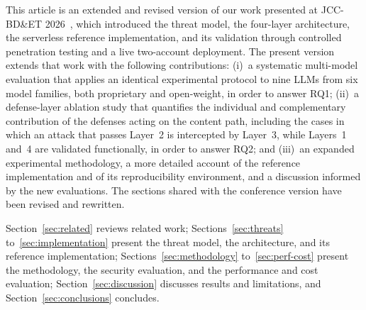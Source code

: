 This article is an extended and revised version of our work presented at JCC-BD\&ET 2026~\cite{petrocelli2026jcc}, which introduced the threat model, the four-layer architecture, the serverless reference implementation, and its validation through controlled penetration testing and a live two-account deployment. The present version extends that work with the following contributions: (i)~a systematic multi-model evaluation that applies an identical experimental protocol to nine LLMs from six model families, both proprietary and open-weight, in order to answer RQ1; (ii)~a defense-layer ablation study that quantifies the individual and complementary contribution of the defenses acting on the content path, including the cases in which an attack that passes Layer~2 is intercepted by Layer~3, while Layers~1 and~4 are validated functionally, in order to answer RQ2; and (iii)~an expanded experimental methodology, a more detailed account of the reference implementation and of its reproducibility environment, and a discussion informed by the new evaluations. The sections shared with the conference version have been revised and rewritten.

Section~\ref{sec:related} reviews related work; Sections~\ref{sec:threats} to~\ref{sec:implementation} present the threat model, the architecture, and its reference implementation; Sections~\ref{sec:methodology} to~\ref{sec:perf-cost} present the methodology, the security evaluation, and the performance and cost evaluation; Section~\ref{sec:discussion} discusses results and limitations, and Section~\ref{sec:conclusions} concludes.
